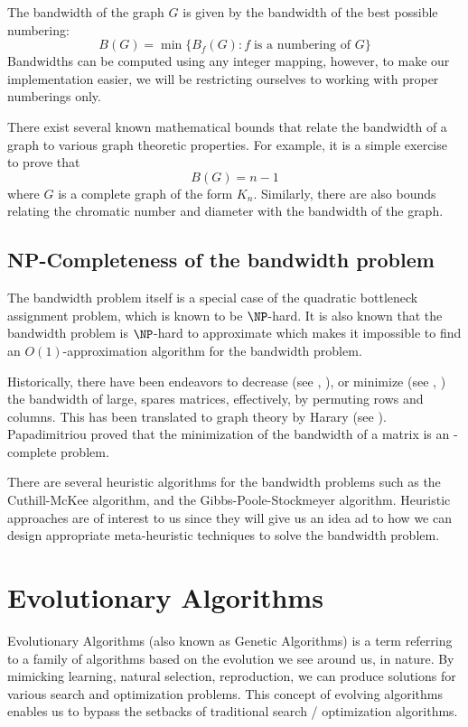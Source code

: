 \documentclass[conference,compsoc]{IEEEtran}
\begin{document}
The bandwidth of the graph $G$ is given by the bandwidth of the best possible numbering:
\begin{equation}
  B(G) = \min \{B_f(G): f \; \text{is a numbering of }  G\}
\end{equation}
Bandwidths can be computed using any integer mapping, however, to make our implementation 
easier, we will be restricting ourselves to working with proper numberings only.

There exist several known mathematical bounds that relate the bandwidth of a graph 
to various graph theoretic properties. For example, it is a simple exercise to prove that 
\[B(G) = n - 1\] where $G$ is a complete graph of the form $K_n$. Similarly, there are also bounds 
relating the chromatic number and diameter with the bandwidth of the graph.  \cite{ccdg1982}

\subsection{NP-Completeness of the bandwidth problem}

The bandwidth problem itself is a special case of the quadratic bottleneck assignment problem, which is known to be 
$\NP$-hard. It is also known that the bandwidth problem is $\NP$-hard to approximate which makes it impossible to find 
an $O(1)$-approximation algorithm for the bandwidth problem. 

Historically, there have been endeavors to decrease (see \cite{10.1145/800195.805928}, \cite{sparse}), or minimize 
(see \cite{chen}, \cite{chen2}) 
the bandwidth of large, spares matrices, effectively, by permuting rows and columns. 
This has been translated to graph theory by Harary (see \cite{1973141}). 
Papadimitriou proved that the minimization of the bandwidth of a matrix is an 
\NP-complete problem. \cite{papadimitriou_1976}

There are several heuristic algorithms for the bandwidth problems such as the Cuthill-McKee algorithm, and the 
Gibbs-Poole-Stockmeyer algorithm. Heuristic approaches are of interest to us since they will give us an 
idea ad to how we can design appropriate meta-heuristic techniques to solve the bandwidth problem. 

\section{Evolutionary Algorithms}
Evolutionary Algorithms (also known as Genetic Algorithms) is a term referring to a 
family of algorithms based on the evolution we see around us, in nature. By mimicking learning, 
natural selection, reproduction, we can produce solutions for various search and optimization problems. 
This concept of evolving algorithms enables us to bypass the setbacks of traditional search / optimization algorithms.
\end{document}
